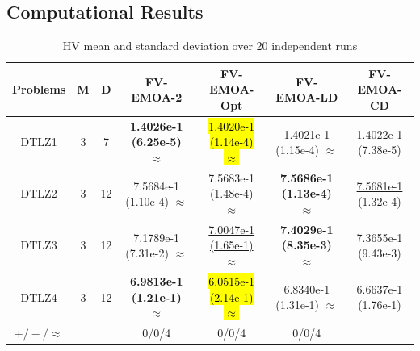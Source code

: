 \documentclass[conference]{IEEEtran}
\begin{document}
\subsection{Computational Results}
\begin{table}[!t]
  \caption{HV mean and standard deviation over 20 independent runs} %
  \label{table_hv_FVEMOA}
  \centering
  \begin{tabular}{ccccccc}
    \hline
    Problems        & M  & D & FV-EMOA-2                         & FV-EMOA-Opt                       & FV-EMOA-LD                        & FV-EMOA-CD                           \\ 
    \hline
    \multirow{1}{*}{DTLZ1}&3&7&\textbf{1.4026e-1 (6.25e-5) $\approx$}&\hl{1.4020e-1 (1.14e-4) $\approx$}&1.4021e-1 (1.15e-4) $\approx$&1.4022e-1 (7.38e-5)\\
    
    DTLZ2&3&12&7.5684e-1 (1.10e-4) $\approx$&7.5683e-1 (1.48e-4) $\approx$&\textbf{7.5686e-1 (1.13e-4) $\approx$}&\underline{7.5681e-1 (1.32e-4)}\\
    
    DTLZ3&3&12&7.1789e-1 (7.31e-2) $\approx$&\underline{7.0047e-1 (1.65e-1) $\approx$}&\textbf{7.4029e-1 (8.35e-3) $\approx$}&7.3655e-1 (9.43e-3)\\
    
    DTLZ4&3&12&\textbf{6.9813e-1 (1.21e-1) $\approx$}&\hl{6.0515e-1 (2.14e-1) $\approx$}&6.8340e-1 (1.31e-1) $\approx$&6.6637e-1 (1.76e-1)\\
    \hline
    $+/-/\approx$& & &0/0/4&0/0/4&0/0/4&\\

  \end{tabular}
\end{table}
\end{document}
